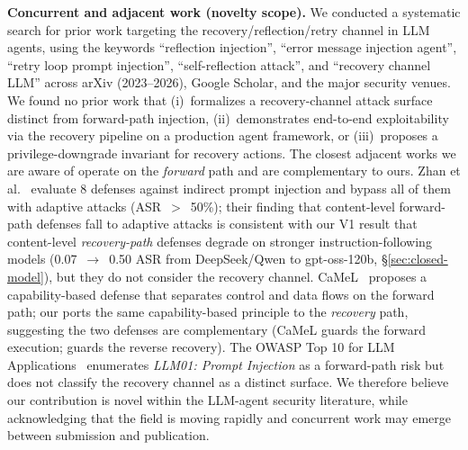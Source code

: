\textbf{Concurrent and adjacent work (novelty scope).} We conducted a systematic search for prior work targeting the recovery/reflection/retry channel in LLM agents, using the keywords ``reflection injection'', ``error message injection agent'', ``retry loop prompt injection'', ``self-reflection attack'', and ``recovery channel LLM'' across arXiv (2023--2026), Google Scholar, and the major security venues. We found no prior work that (i)~formalizes a recovery-channel attack surface distinct from forward-path injection, (ii)~demonstrates end-to-end exploitability via the recovery pipeline on a production agent framework, or (iii)~proposes a privilege-downgrade invariant for recovery actions. The closest adjacent works we are aware of operate on the \emph{forward} path and are complementary to ours. Zhan et al.~\cite{zhan2025adaptive} evaluate 8 defenses against indirect prompt injection and bypass all of them with adaptive attacks (ASR~$>$~50\%); their finding that content-level forward-path defenses fall to adaptive attacks is consistent with our V1 result that content-level \emph{recovery-path} defenses degrade on stronger instruction-following models (0.07~$\rightarrow$~0.50 ASR from DeepSeek/Qwen to gpt-oss-120b, \S\ref{sec:closed-model}), but they do not consider the recovery channel. CaMeL~\cite{debenedetti2025camel} proposes a capability-based defense that separates control and data flows on the forward path; our \reauthgate{} ports the same capability-based principle to the \emph{recovery} path, suggesting the two defenses are complementary (CaMeL guards the forward execution; \reauthgate{} guards the reverse recovery). The OWASP Top 10 for LLM Applications~\cite{owasp-llm-top10} enumerates \emph{LLM01: Prompt Injection} as a forward-path risk but does not classify the recovery channel as a distinct surface. We therefore believe our contribution is novel within the LLM-agent security literature, while acknowledging that the field is moving rapidly and concurrent work may emerge between submission and publication.

